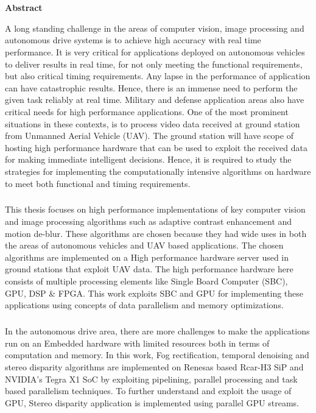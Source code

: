 
\chapter*{}
	\vspace*{-5cm}
							\begin{center}
								\textbf{Abstract}
							\end{center}

A long standing challenge in the areas of computer vision, image processing and autonomous drive systems is to achieve high accuracy with real time performance. It is very critical for applications deployed on autonomous vehicles to deliver results in real time, for not only meeting the functional requirements, but also critical timing requirements. Any lapse in the performance of application can have catastrophic results. Hence, there is an immense need to perform the given task reliably at real time. Military and defense application areas also have critical needs for high performance applications. One of the most prominent situations in these contexts, is to process video data received at ground station from Unmanned Aerial Vehicle (UAV). The ground station will have scope of hosting high performance hardware that can be used to exploit the received data for making immediate intelligent decisions. Hence, it is required to study the strategies for implementing the computationally intensive algorithms on hardware to meet both functional and timing requirements. \paragraph*{}This thesis focuses on high performance implementations of key computer vision and image processing algorithms such as adaptive contrast enhancement and motion de-blur. These algorithms are chosen because they had wide uses in both the areas of autonomous vehicles and UAV based applications. The chosen algorithms are implemented on a High performance hardware server used in ground stations that exploit UAV data. The high performance hardware here consists of multiple processing elements like Single Board Computer (SBC), GPU, DSP \& FPGA. This work exploits SBC and GPU for implementing these applications using concepts of data parallelism and memory optimizations.
\paragraph*{}In the autonomous drive area, there are more challenges to make the applications run on an Embedded hardware with limited resources both in terms of computation and memory. In this work, Fog rectification, temporal denoising and stereo disparity algorithms are implemented on Renesas based Rcar-H3 SiP and NVIDIA’s Tegra X1 SoC by exploiting pipelining, parallel processing and task based parallelism techniques. To further understand and exploit the usage of GPU, Stereo disparity application is implemented using parallel GPU streams.
